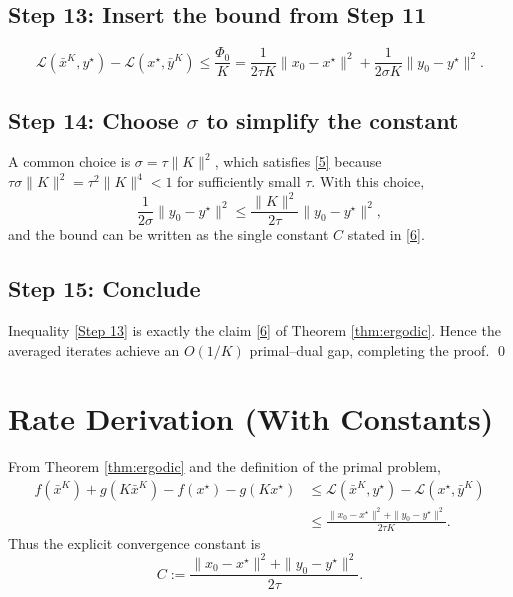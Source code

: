 \documentclass[11pt]{article}
\newcommand{\norm}[1]{\|#1\|}
\begin{document}
\subsection*{Step 13: Insert the bound from Step 11}
\[
\mathcal{L}(\bar{x}^{K},y^{\star})-\mathcal{L}(x^{\star},\bar{y}^{K})
\le
\frac{\Phi_{0}}{K}
=
\frac{1}{2\tau K}\norm{x_{0}-x^{\star}}^{2}
+\frac{1}{2\sigma K}\norm{y_{0}-y^{\star}}^{2}.
\tag{Step 13}
\]

\subsection*{Step 14: Choose $\sigma$ to simplify the constant}
A common choice is $\sigma = \tau\|K\|^{2}$, which satisfies \eqref{5} because $\tau\sigma\|K\|^{2}= \tau^{2}\|K\|^{4}<1$ for sufficiently small $\tau$. With this choice,
\[
\frac{1}{2\sigma}\norm{y_{0}-y^{\star}}^{2}
\le
\frac{\|K\|^{2}}{2\tau}\norm{y_{0}-y^{\star}}^{2},
\]
and the bound can be written as the single constant $C$ stated in \eqref{6}.

\subsection*{Step 15: Conclude}
Inequality \eqref{Step 13} is exactly the claim \eqref{6} of Theorem \ref{thm:ergodic}. Hence the averaged iterates achieve an $O(1/K)$ primal–dual gap, completing the proof. \qed

\section*{Rate Derivation (With Constants)}
From Theorem \ref{thm:ergodic} and the definition of the primal problem,
\[
\begin{aligned}
f(\bar{x}^{K})+g(K\bar{x}^{K})-f(x^{\star})-g(Kx^{\star})
&\le
\mathcal{L}(\bar{x}^{K},y^{\star})-\mathcal{L}(x^{\star},\bar{y}^{K})\\
&\le
\frac{\norm{x_{0}-x^{\star}}^{2}+ \norm{y_{0}-y^{\star}}^{2}}{2\tau K}.
\end{aligned}
\]
Thus the explicit convergence constant is
\[
C:=\frac{\norm{x_{0}-x^{\star}}^{2}+ \norm{y_{0}-y^{\star}}^{2}}{2\tau}.
\]
\end{document}

